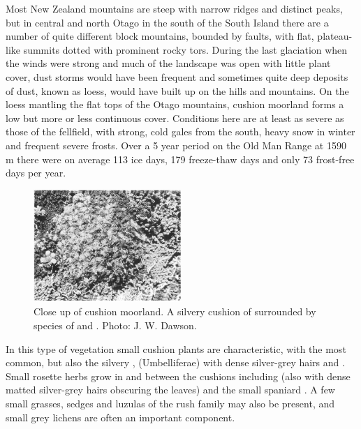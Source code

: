 Most New Zealand mountains are steep with narrow ridges and distinct peaks, but in central and north Otago in the south of the South Island there are a number of quite different block mountains, bounded by faults, with flat, plateau-like summits dotted with prominent rocky tors.
During the last glaciation when the winds were strong and much of the landscape was open with little plant cover, dust storms would have been frequent and sometimes quite deep deposits of dust, known as loess, would have built up on the hills and mountains.
On the loess mantling the flat tops of the Otago mountains, cushion moorland forms a low but more or less continuous cover.
Conditions here are at least as severe as those of the fellfield, with strong, cold gales from the south, heavy snow in winter and frequent severe frosts.
Over a 5 year period on the Old Man Range at 1590 m there were on average 113 ice days, 179 freeze-thaw days and only 73 frost-free days per year.

\begin{figure}
	\includegraphics[width=0.5\textwidth]{graphics/figure114cushion-moorland.jpg}
	\centering
	\caption[Close up of cushion moorland]{Close up of cushion moorland.
A silvery cushion of  surrounded by species of  and .
	Photo: J. W. Dawson.}
	\label{fig:114cushion-moorland}
\end{figure}

In this type of vegetation small cushion plants are characteristic, with  the most common, but also the silvery ,  (Umbelliferae) with dense silver-grey hairs and .
Small rosette herbs grow in and between the cushions including  (also with dense matted silver-grey hairs obscuring the leaves) and the small spaniard .
A few small grasses, sedges and luzulas of the rush family may also be present, and small grey lichens are often an important component.

